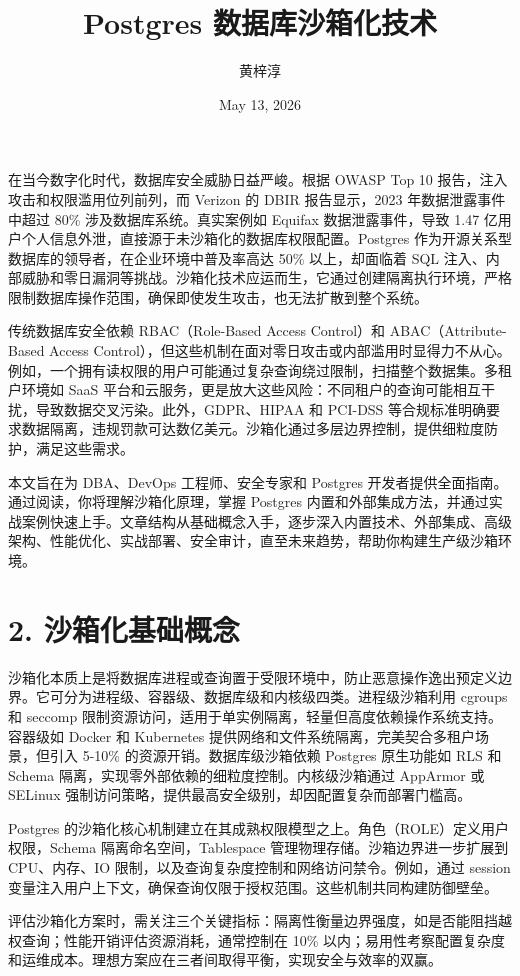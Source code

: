\title{Postgres 数据库沙箱化技术}
\author{黄梓淳}
\date{May 13, 2026}
\maketitle
在当今数字化时代，数据库安全威胁日益严峻。根据 OWASP Top 10 报告，注入攻击和权限滥用位列前列，而 Verizon 的 DBIR 报告显示，2023 年数据泄露事件中超过 80\%{} 涉及数据库系统。真实案例如 Equifax 数据泄露事件，导致 1.47 亿用户个人信息外泄，直接源于未沙箱化的数据库权限配置。Postgres 作为开源关系型数据库的领导者，在企业环境中普及率高达 50\%{} 以上，却面临着 SQL 注入、内部威胁和零日漏洞等挑战。沙箱化技术应运而生，它通过创建隔离执行环境，严格限制数据库操作范围，确保即使发生攻击，也无法扩散到整个系统。\par
传统数据库安全依赖 RBAC（Role-Based Access Control）和 ABAC（Attribute-Based Access Control），但这些机制在面对零日攻击或内部滥用时显得力不从心。例如，一个拥有读权限的用户可能通过复杂查询绕过限制，扫描整个数据集。多租户环境如 SaaS 平台和云服务，更是放大这些风险：不同租户的查询可能相互干扰，导致数据交叉污染。此外，GDPR、HIPAA 和 PCI-DSS 等合规标准明确要求数据隔离，违规罚款可达数亿美元。沙箱化通过多层边界控制，提供细粒度防护，满足这些需求。\par
本文旨在为 DBA、DevOps 工程师、安全专家和 Postgres 开发者提供全面指南。通过阅读，你将理解沙箱化原理，掌握 Postgres 内置和外部集成方法，并通过实战案例快速上手。文章结构从基础概念入手，逐步深入内置技术、外部集成、高级架构、性能优化、实战部署、安全审计，直至未来趋势，帮助你构建生产级沙箱环境。\par
\chapter{2. 沙箱化基础概念}
沙箱化本质上是将数据库进程或查询置于受限环境中，防止恶意操作逸出预定义边界。它可分为进程级、容器级、数据库级和内核级四类。进程级沙箱利用 cgroups 和 seccomp 限制资源访问，适用于单实例隔离，轻量但高度依赖操作系统支持。容器级如 Docker 和 Kubernetes 提供网络和文件系统隔离，完美契合多租户场景，但引入 5-10\%{} 的资源开销。数据库级沙箱依赖 Postgres 原生功能如 RLS 和 Schema 隔离，实现零外部依赖的细粒度控制。内核级沙箱通过 AppArmor 或 SELinux 强制访问策略，提供最高安全级别，却因配置复杂而部署门槛高。\par
Postgres 的沙箱化核心机制建立在其成熟权限模型之上。角色（ROLE）定义用户权限，Schema 隔离命名空间，Tablespace 管理物理存储。沙箱边界进一步扩展到 CPU、内存、IO 限制，以及查询复杂度控制和网络访问禁令。例如，通过 session 变量注入用户上下文，确保查询仅限于授权范围。这些机制共同构建防御壁垒。\par
评估沙箱化方案时，需关注三个关键指标：隔离性衡量边界强度，如是否能阻挡越权查询；性能开销评估资源消耗，通常控制在 10\%{} 以内；易用性考察配置复杂度和运维成本。理想方案应在三者间取得平衡，实现安全与效率的双赢。\par
